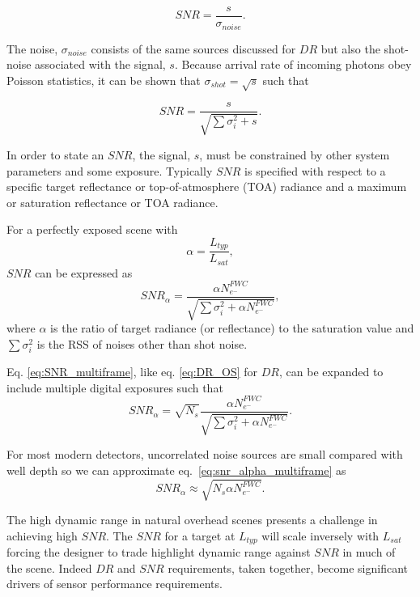 \documentclass[10pt,journal]{IEEEtran}  %
\begin{document}
\begin{equation*}
    SNR = \frac{s}{\sigma_{noise}}.
\end{equation*}

The noise, $\sigma_{noise}$ consists of the same sources discussed for $DR$ but also the shot-noise associated with the signal, $s$.  Because arrival rate of incoming photons obey Poisson statistics, it can be shown that $\sigma_{shot} = \sqrt{s}$ such that

\begin{equation*}
    SNR = \frac{s}{\sqrt{\sum{\sigma_i^2} + s}}.
\end{equation*}

In order to state an $SNR$, the signal, $s$, must be constrained by other system parameters and some exposure.  Typically $SNR$ is specified with respect to a specific target reflectance or top-of-atmosphere (TOA) radiance and a maximum or saturation reflectance or TOA radiance.  

For a perfectly exposed scene with
\begin{equation}
    \alpha = \frac{L_{typ}}{L_{sat}},
\end{equation}
${SNR}$ can be expressed as
\begin{equation}
    SNR_{\alpha} = \frac{\alpha N_{e^-}^{FWC}}{\sqrt{\sum{\sigma_i^2} + \alpha N_{e^-}^{FWC}}},
\label{eq:SNR_multiframe}
\end{equation}
where $\alpha$ is the ratio of target radiance (or reflectance) to the saturation value and $\sum{\sigma_i^2}$ is the RSS of noises other than shot noise.

Eq. \eqref{eq:SNR_multiframe}, like eq. \eqref{eq:DR_OS} for $DR$, can be expanded to include multiple digital exposures such that
\begin{equation}
\label{eq:snr_alpha_multiframe}
SNR_{\alpha} = \sqrt{N_s}\frac{\alpha N_{e^-}^{FWC}}{\sqrt{\sum{\sigma_i^2} + \alpha N_{e^-}^{FWC}}}.
\end{equation}

For most modern detectors, uncorrelated noise sources are small compared with well depth so we can approximate eq.~\eqref{eq:snr_alpha_multiframe} as
\begin{equation}
\label{eq:snr_alpha_multiframe_simp}
SNR_{\alpha} \approx \sqrt{N_s \alpha N_{e^-}^{FWC}}.
\end{equation}

The high dynamic range in natural overhead scenes presents a challenge in achieving high $SNR$.  The $SNR$ for a target at $L_{typ}$ will scale inversely with $L_{sat}$ forcing the designer to trade highlight dynamic range against $SNR$ in much of the scene.  Indeed $DR$ and $SNR$ requirements, taken together, become significant drivers of sensor performance requirements.
\end{document}
